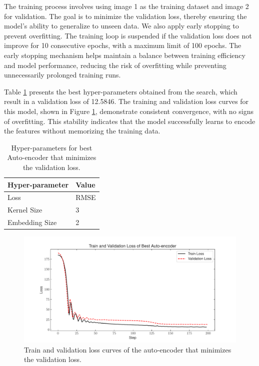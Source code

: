 \documentclass[11pt,letterpaper]{article}
\begin{document}
The training process involves using image 1 as the training dataset and image 2 for validation. The goal is to minimize the validation loss, thereby ensuring the model's ability to generalize to unseen data. We also apply early stopping to prevent overfitting. The training loop is suspended if the validation loss does not improve for 10 consecutive epochs, with a maximum limit of 100 epochs. The early stopping mechanism helps maintain a balance between training efficiency and model performance, reducing the risk of overfitting while preventing unnecessarily prolonged training runs.

Table \ref{table:Auto-encoder_best_hp} presents the best hyper-parameters obtained from the search, which result in a validation loss of 12.5846. The training and validation loss curves for this model, shown in Figure \ref{fig_autoencoder_loss}, demonstrate consistent convergence, with no signs of overfitting. This stability indicates that the model successfully learns to encode the features without memorizing the training data.

\begin{table}[]
\centering
\begin{tabular}{|l|l|}
\hline
\textbf{Hyper-parameter} & \textbf{Value} \\ \hline
Loss                    & RMSE            \\ \hline
Kernel Size             & 3               \\ \hline
Embedding Size          & 2               \\ \hline
\end{tabular}
\caption{Hyper-parameters for best Auto-encoder that minimizes the validation loss.}
\label{table:Auto-encoder_best_hp}
\end{table}

\begin{figure}[H]
    \centering
    \includegraphics[width=\linewidth]{figs/autoencoder_loss.pdf}
    \caption{Train and validation loss curves of the auto-encoder that minimizes the validation loss.}
    \label{fig_autoencoder_loss}
\end{figure}
\end{document}
